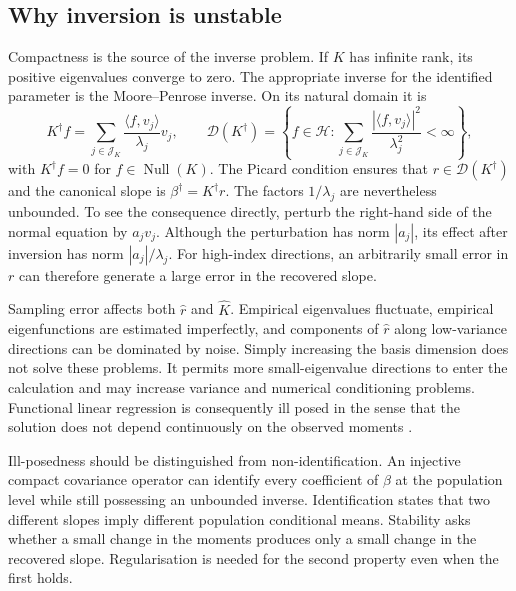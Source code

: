 \subsection{Why inversion is unstable}

Compactness is the source of the inverse problem. If $K$ has infinite rank, its positive eigenvalues converge to zero. The appropriate inverse for the identified parameter is the Moore--Penrose inverse. On its natural domain it is
\begin{equation}
    K^\dagger f
    =\sum_{j\in\mathcal J_K}
      \frac{\langle f,v_j\rangle}{\lambda_j}v_j,
    \qquad
    \mathcal D(K^\dagger)
    =\left\{f\in\mathcal H:
      \sum_{j\in\mathcal J_K}
      \frac{|\langle f,v_j\rangle|^2}{\lambda_j^2}<\infty\right\},
    \label{eq:moore-penrose-inverse}
\end{equation}
with $K^\dagger f=0$ for $f\in\operatorname{Null}(K)$.  The Picard condition
ensures that $r\in\mathcal D(K^\dagger)$ and the canonical slope is
$\beta^\dagger=K^\dagger r$.  The factors $1/\lambda_j$ are nevertheless
unbounded. To see the consequence directly, perturb the right-hand side of the normal equation by $a_jv_j$. Although the perturbation has norm $|a_j|$, its effect after inversion has norm $|a_j|/\lambda_j$. For high-index directions, an arbitrarily small error in $r$ can therefore generate a large error in the recovered slope.

Sampling error affects both $\widehat r$ and $\widehat K$. Empirical eigenvalues fluctuate, empirical eigenfunctions are estimated imperfectly, and components of $\widehat r$ along low-variance directions can be dominated by noise. Simply increasing the basis dimension does not solve these problems. It permits more small-eigenvalue directions to enter the calculation and may increase variance and numerical conditioning problems. Functional linear regression is consequently ill posed in the sense that the solution does not depend continuously on the observed moments \parencite{engl_hanke_neubauer_1996,hall_horowitz_2007}.

Ill-posedness should be distinguished from non-identification. An injective compact covariance operator can identify every coefficient of $\beta$ at the population level while still possessing an unbounded inverse. Identification states that two different slopes imply different population conditional means. Stability asks whether a small change in the moments produces only a small change in the recovered slope. Regularisation is needed for the second property even when the first holds.

